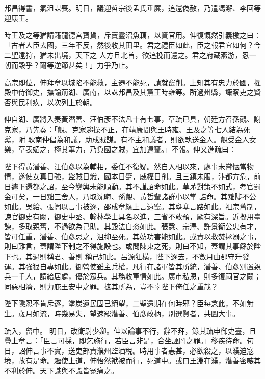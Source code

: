 \begin{pinyinscope}
 邦昌得書，氣沮謀喪。明日，議迎哲宗後孟氏垂簾，追還偽赦，乃遣馮澥、李回等迎康王。



 時王及之等猶請籍龍德宮寶貨，斥賣靈沼魚藕，以資官用。伸復慨然引義檄之曰：「古者人臣去國，三年不反，然後收其田里。君之禮臣如此，臣之報君宜如何？今二聖遠狩，猶未出境，天下之
 人方且北首，欲追挽而還之。君之府藏燕游，忍一朝而毀乎？爾等逆節甚矣！」力爭乃止。



 高宗即位，伸拜章以城陷不能救，主遷不能死，請就竄削。上知其有忠力於國，擢殿中侍御史，撫諭荊湖、廣南，以誅邦昌及其黨王時雍等。所過州縣，諏察吏之賢否與民利疚，以次列上於朝。



 伸自湖、廣將入奏黃潛善、汪伯彥不法凡十有七事，草疏已具，朝廷方召孫覿、謝克家，乃先奏：「覿、克家趨操不正，在靖康間與王時雍、王及之等七人結為死黨，附
 耿南仲倡為和議，助成賊謀。有不主和議者，則欲執送金人。覿受金人女樂，草表媚之，極其筆力，乃負國之賊，宜加遠竄。」不報。伸又進疏曰：



 陛下得黃潛善、汪伯彥以為輔相，委任不復疑。然自入相以來，處事未嘗愜當物情，遂使女真日強，盜賊日熾，國本日蹙，威權日削。且三鎮未服，汴都方危，前日遽下還都之詔，至今鑾輿未能順動。其不謹詔命如此。草茅對策不如式，考官罰金可矣，一日黜三舍人，乃取沈晦、孫覿、黃哲輩諸群小以掌
 誥命。其黜陟不公如此。吳給、張訚以言事被逐，邵成章緣上言遠竄。其壅塞言路如此。祖宗舊制，諫官御史有闕，御史中丞、翰林學士具名以進，三省不敢預，厥有深旨。近擬用臺諫，多取親舊，不過欲為己助。其毀法自恣如此。張愨、宗澤、許景衡公忠有才，皆可任重，潛善、伯彥忌之，沮抑至死。其妨功害能如此。或責以救焚拯溺之事，則曰難言，蓋謂陛下制之不得施設也。或問陳東之死，則曰不知，蓋謂其事繇於陛下也。其過則稱君、善則
 稱己如此。呂源狂橫，陛下逐去，不數月由郡守升發運。其強狠自專如此。御營使雖主兵權，凡行在諸軍皆其所統，潛善、伯彥別置親兵一千人，請給居處，優於眾兵。其務收軍情如此。廣市私恩，則多復祠官之闕；同惡相濟，則力庇王安中之罪。摭其所為，豈不辜陛下倚任之重哉？



 陛下隱忍不肯斥逐，塗炭遺民固已絕望，二聖還期在何時邪？臣每念此，不如無生。歲月如流，時幾易失，望速罷潛善、伯彥政柄，別選賢者，共圖大事。



 疏入，留中。
 明日，改衛尉少卿。伸以論事不行，辭不拜，錄其疏申御史臺，且疊上章言：「臣言可採，即乞施行，若臣言非是，合坐誣罔之罪。」移疾待命。旬日，詔伸言事不實，送吏部責濮州監酒稅。時用事者恚甚，必欲殺之，以濮迫寇境，故有是命。趣使上道，伸怡然袱被而行，死道中。或曰王淵在濮，潛善密嗾其不利於伸。天下識與不識皆冤痛之。




\end{pinyinscope}
